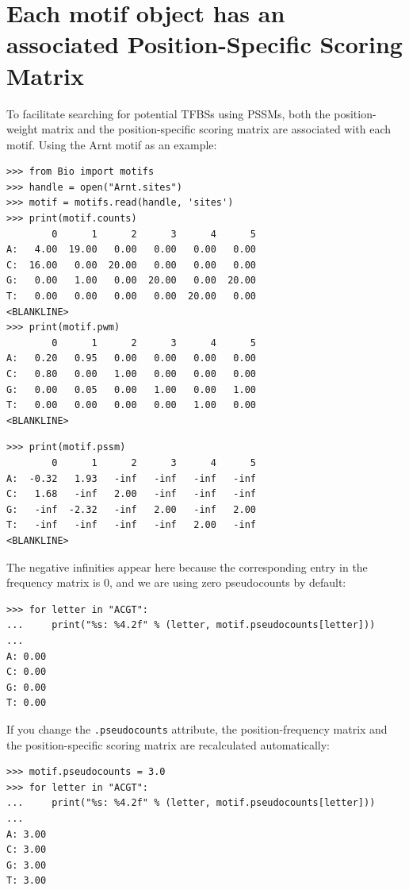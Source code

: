 \documentclass{report}
\begin{document}
\section{Each motif object has an associated Position-Specific Scoring Matrix}

To facilitate searching for potential TFBSs using PSSMs, both the position-weight matrix and the position-specific scoring matrix are associated with each motif. Using the Arnt motif as an example:
\begin{verbatim}
>>> from Bio import motifs
>>> handle = open("Arnt.sites")
>>> motif = motifs.read(handle, 'sites')
>>> print(motif.counts)
        0      1      2      3      4      5
A:   4.00  19.00   0.00   0.00   0.00   0.00
C:  16.00   0.00  20.00   0.00   0.00   0.00
G:   0.00   1.00   0.00  20.00   0.00  20.00
T:   0.00   0.00   0.00   0.00  20.00   0.00
<BLANKLINE>
>>> print(motif.pwm)
        0      1      2      3      4      5
A:   0.20   0.95   0.00   0.00   0.00   0.00
C:   0.80   0.00   1.00   0.00   0.00   0.00
G:   0.00   0.05   0.00   1.00   0.00   1.00
T:   0.00   0.00   0.00   0.00   1.00   0.00
<BLANKLINE>
\end{verbatim}
\begin{verbatim}
>>> print(motif.pssm)
        0      1      2      3      4      5
A:  -0.32   1.93   -inf   -inf   -inf   -inf
C:   1.68   -inf   2.00   -inf   -inf   -inf
G:   -inf  -2.32   -inf   2.00   -inf   2.00
T:   -inf   -inf   -inf   -inf   2.00   -inf
<BLANKLINE>
\end{verbatim}
The negative infinities appear here because the corresponding entry in the frequency matrix is 0, and we are using zero pseudocounts by default:
\begin{verbatim}
>>> for letter in "ACGT":
...     print("%s: %4.2f" % (letter, motif.pseudocounts[letter]))
... 
A: 0.00
C: 0.00
G: 0.00
T: 0.00
\end{verbatim}
If you change the \verb+.pseudocounts+ attribute, the position-frequency matrix and the position-specific scoring matrix are recalculated automatically:
\begin{verbatim}
>>> motif.pseudocounts = 3.0
>>> for letter in "ACGT":
...     print("%s: %4.2f" % (letter, motif.pseudocounts[letter]))
... 
A: 3.00
C: 3.00
G: 3.00
T: 3.00
\end{verbatim}
\end{document}
